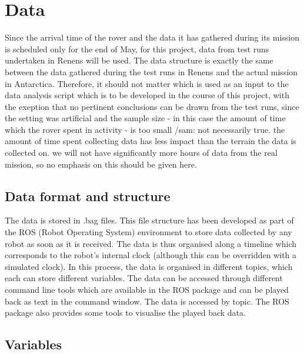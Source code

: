 \documentclass[11pt, UKenglish]{report}
\begin{document}
{\begin{enumerate}
\end{enumerate}


\section*{Data}

Since the arrival time of the rover and the data it has gathered during its mission is scheduled only for the end of May, for this project, data from test runs undertaken in Renens will be used. The data structure is exactly the same between the data gathered during the test runs in Renens and the actual mission in Antarctica. Therefore, it should not matter which is used as an input to the data analysis script which is to be developed in the course of this project, with the exeption that no pertinent conclusions can be drawn from the test runs, since the setting was artificial and the sample size - in this case the amount of time which the rover spent in activity - is too small /sam: {not necessarily true. the amount of time spent collecting data has less impact than the terrain the data is collected on. we will not have significantly more hours of data from the real mission, so no emphasis on this should be given here}.

\subsection*{Data format and structure}

The data is stored in .bag files. This file structure has been developed as part of the ROS (Robot Operating System) environment to store data collected by any robot as soon as it is received. The data is thus organised along a timeline which corresponds to the robot's internal clock (although this can be overridden with a simulated clock). In this process, the data is organised in different topics, which each can store different variables. The data can be accessed through different command line tools which are available in the ROS package and can be played back as text in the command window. The data is accessed by topic. The ROS package also provides some tools to visualise the played back data.

\subsection*{Variables}

}
\end{document}
